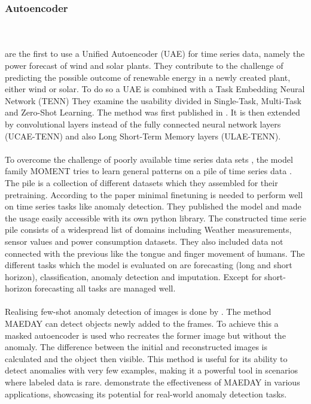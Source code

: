 \subsubsection{Autoencoder}
\cite{yue_ts2vec_2022}\\\\%
 are the first to use a Unified Autoencoder (UAE) for time series data, namely the power forecast of wind and solar plants. They contribute to the challenge of predicting the possible outcome of renewable energy in a newly created plant, either wind or solar. To do so a UAE is combined with a Task Embedding Neural Network (TENN) They examine the usability divided in Single-Task, Multi-Task and Zero-Shot Learning. The method was first published in . It is then extended by convolutional layers instead of the fully connected neural network layers (UCAE-TENN)
and also Long Short-Term Memory layers (ULAE-TENN).\\\\
To overcome the challenge of poorly available time series data sets \cite{ma_survey_2023}, the model family MOMENT tries to learn general patterns on a pile of time series data \cite{goswami_moment_2024}. The pile is a collection of different datasets which they assembled for their pretraining. According to the paper minimal finetuning is needed to perform well on time series tasks like anomaly detection. They published the model and made the usage easily accessible with its own python library. The constructed time serie pile consists of a widespread list of domains including Weather measurements, sensor values and power consumption datasets. They also included data not connected with the previous like the tongue and finger movement of humans. The different tasks which the model is evaluated on are forecasting (long and short horizon), classification, anomaly detection and imputation. Except for short-horizon forecasting all tasks are managed well. \\\\
Realising few-shot anomaly detection of images is done by . The method MAEDAY can detect objects newly added to the frames. To achieve this a masked autoencoder is used who recreates the former image but without the anomaly. The difference between the initial and reconstructed images is calculated and the object then visible.
This method is useful for its ability to detect anomalies with very few examples, making it a powerful tool in scenarios where labeled data is rare.  demonstrate the effectiveness of MAEDAY in various applications, showcasing its potential for real-world anomaly detection tasks.\\\\
